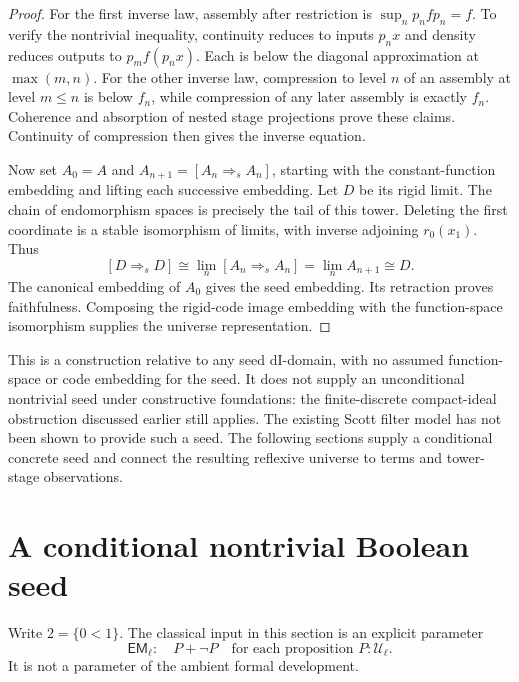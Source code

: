 \documentclass[11pt]{article}
\begin{document}
\begin{proof}
For the first inverse law, assembly after restriction is
$\sup_n p_nfp_n=f$. To verify the nontrivial inequality, continuity
reduces to inputs $p_nx$ and density reduces outputs to
$p_mf(p_nx)$. Each is below the diagonal approximation at
$\max(m,n)$. For the other inverse law, compression to level $n$ of an
assembly at level $m\le n$ is below $f_n$, while compression of any
later assembly is exactly $f_n$. Coherence and absorption of nested
stage projections prove these claims. Continuity of compression then
gives the inverse equation.

Now set $A_0=A$ and $A_{n+1}=[A_n\Rightarrow_s A_n]$, starting with
the constant-function embedding and lifting each successive embedding.
Let $D$ be its rigid limit. The chain of endomorphism spaces is precisely
the tail of this tower. Deleting the first coordinate is a stable
isomorphism of limits, with inverse adjoining $r_0(x_1)$. Thus
\[
 [D\Rightarrow_s D]\cong\lim_n[A_n\Rightarrow_s A_n]
   =\lim_n A_{n+1}\cong D.
\]
The canonical embedding of $A_0$ gives the seed embedding. Its retraction
proves faithfulness. Composing the rigid-code image embedding with the
function-space isomorphism supplies the universe representation.
\end{proof}

This is a construction relative to any seed dI-domain, with no assumed
function-space or code embedding for the seed. It does not supply an
unconditional nontrivial seed under constructive foundations: the
finite-discrete compact-ideal obstruction discussed earlier still
applies. The existing Scott filter model has not been shown to provide
such a seed. The following sections supply a conditional concrete seed and connect
the resulting reflexive universe to terms and tower-stage observations.

\section{A conditional nontrivial Boolean seed}

Write $2=\{0<1\}$. The classical input in this section is an explicit
parameter
\[
 \mathsf{EM}_{\ell}:\quad P+\neg P
 \quad\text{for each proposition }P:\mathcal U_{\ell}.
\]
It is not a parameter of the ambient formal development.
\end{document}
